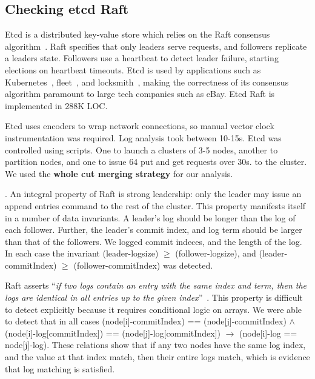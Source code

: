 \subsection{Checking etcd Raft}

Etcd is a distributed key-value store which relies on the Raft
consensus algorithm~\cite{RaftATC14}. Raft specifies that only leaders
serve requests, and followers replicate a leaders state. Followers use
a heartbeat to detect leader failure, starting elections on heartbeat
timeouts. Etcd is used by applications such as
Kubernetes~\cite{kubernetes}, fleet~\cite{fleet}, and
locksmith~\cite{locksmith}, making the correctness of its consensus
algorithm paramount to large tech companies such as eBay.
Etcd Raft is implemented in 288K LOC.

Etcd uses encoders to wrap network connections, so manual vector clock
instrumentation was required. Log analysis took between 10-15s.  Etcd
was controlled using scripts. One to launch a clusters of 3-5 nodes, another to
partition nodes, and one to issue 64 put and get requests over 30s.
to the cluster.  We used the \textbf{whole cut merging strategy} for
our analysis.

. An integral property of Raft is
strong leadership: only the leader may issue an append entries command
to the rest of the cluster. This property manifests itself in a number
of data invariants. A leader's log should be longer than the log of
each follower.  Further, the leader's commit index, and log term
should be larger than that of the followers.  We logged commit
indeces, and the length of the log.  In each case the invariant
(leader-logsize) $\ge$ (follower-logsize), and (leader-commitIndex)
$\ge$ (follower-commitIndex) was detected.

 Raft asserts ``\emph{if two logs
  contain an entry with the same index and term, then the logs are
  identical in all entries up to the given index}''~\cite{RaftATC14}.
This property is difficult to detect explicitly because it requires
conditional logic on arrays.  We were able to detect that in all cases
(node[i]-commitIndex) == (node[j]-commitIndex) $\wedge$
(node[i]-log[commitIndex]) == (node[j]-log[commitIndex]) $\rightarrow$
(node[i]-log == node[j]-log). These relations show that if any two
nodes have the same log index, and the value at that index match, then
their entire logs match, which is evidence that log matching is
satisfied.

